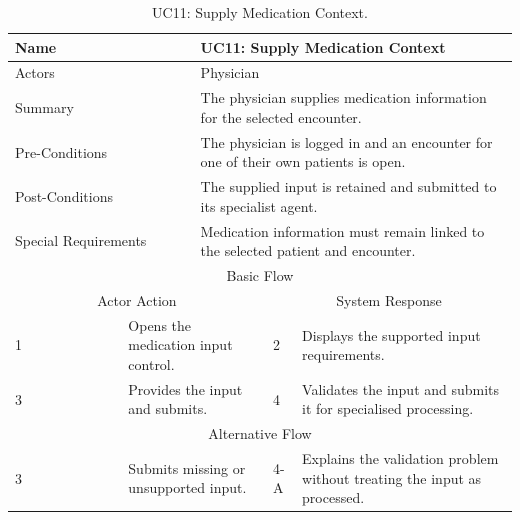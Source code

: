 \begin{table}[htbp]
\centering
\small
\caption{UC11: Supply Medication Context.}
\label{tab:kashaf:uc11}
\begin{tabular}{|p{}|p{}|p{}|p{}|p{}|}
\hline
\multicolumn{2}{|p{\dimexpr0.225\textwidth+2\tabcolsep+\arrayrulewidth\relax}|}{Name} & \multicolumn{3}{p{\dimexpr0.575\textwidth+4\tabcolsep+2\arrayrulewidth\relax}|}{UC11: Supply Medication Context} \\ \hline
\multicolumn{2}{|p{\dimexpr0.225\textwidth+2\tabcolsep+\arrayrulewidth\relax}|}{Actors} & \multicolumn{3}{p{\dimexpr0.575\textwidth+4\tabcolsep+2\arrayrulewidth\relax}|}{Physician} \\ \hline
\multicolumn{2}{|p{\dimexpr0.225\textwidth+2\tabcolsep+\arrayrulewidth\relax}|}{Summary} & \multicolumn{3}{p{\dimexpr0.575\textwidth+4\tabcolsep+2\arrayrulewidth\relax}|}{The physician supplies medication information for the selected encounter.} \\ \hline
\multicolumn{2}{|p{\dimexpr0.225\textwidth+2\tabcolsep+\arrayrulewidth\relax}|}{Pre-Conditions} & \multicolumn{3}{p{\dimexpr0.575\textwidth+4\tabcolsep+2\arrayrulewidth\relax}|}{The physician is logged in and an encounter for one of their own patients is open.} \\ \hline
\multicolumn{2}{|p{\dimexpr0.225\textwidth+2\tabcolsep+\arrayrulewidth\relax}|}{Post-Conditions} & \multicolumn{3}{p{\dimexpr0.575\textwidth+4\tabcolsep+2\arrayrulewidth\relax}|}{The supplied input is retained and submitted to its specialist agent.} \\ \hline
\multicolumn{2}{|p{\dimexpr0.225\textwidth+2\tabcolsep+\arrayrulewidth\relax}|}{Special Requirements} & \multicolumn{3}{p{\dimexpr0.575\textwidth+4\tabcolsep+2\arrayrulewidth\relax}|}{Medication information must remain linked to the selected patient and encounter.} \\ \hline
\multicolumn{5}{|c|}{Basic Flow} \\ \hline
\multicolumn{3}{|c|}{Actor Action} & \multicolumn{2}{c|}{System Response} \\ \hline
1 & \multicolumn{2}{p{\dimexpr0.37\textwidth+2\tabcolsep+\arrayrulewidth\relax}|}{Opens the medication input control.} & 2 & Displays the supported input requirements. \\ \hline
3 & \multicolumn{2}{p{\dimexpr0.37\textwidth+2\tabcolsep+\arrayrulewidth\relax}|}{Provides the input and submits.} & 4 & Validates the input and submits it for specialised processing. \\ \hline
\multicolumn{5}{|c|}{Alternative Flow} \\ \hline
3 & \multicolumn{2}{p{\dimexpr0.37\textwidth+2\tabcolsep+\arrayrulewidth\relax}|}{Submits missing or unsupported input.} & 4-A & Explains the validation problem without treating the input as processed. \\ \hline
\end{tabular}
\end{table}

